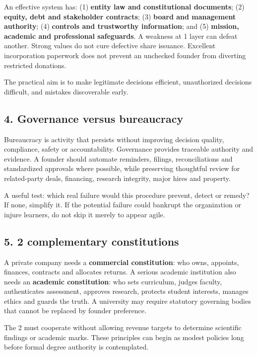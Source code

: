 An effective system has: (1) \textbf{entity law and constitutional documents}; (2) \textbf{equity, debt and stakeholder contracts}; (3) \textbf{board and management authority}; (4) \textbf{controls and trustworthy information}; and (5) \textbf{mission, academic and professional safeguards}. A weakness at 1 layer can defeat another. Strong values do not cure defective share issuance. Excellent incorporation paperwork does not prevent an unchecked founder from diverting restricted donations.

The practical aim is to make legitimate decisions efficient, unauthorized decisions difficult, and mistakes discoverable early.

\subsection{4. Governance versus bureaucracy}

Bureaucracy is activity that persists without improving decision quality, compliance, safety or accountability. Governance provides traceable authority and evidence. A founder should automate reminders, filings, reconciliations and standardized approvals where possible, while preserving thoughtful review for related-party deals, financing, research integrity, major hires and property.

A useful test: which real failure would this procedure prevent, detect or remedy? If none, simplify it. If the potential failure could bankrupt the organization or injure learners, do not skip it merely to appear agile.

\subsection{5. 2 complementary constitutions}

A private company needs a \textbf{commercial constitution}: who owns, appoints, finances, contracts and allocates returns. A serious academic institution also needs an \textbf{academic constitution}: who sets curriculum, judges faculty, authenticates assessment, approves research, protects student interests, manages ethics and guards the truth. A university may require statutory governing bodies that cannot be replaced by founder preference.

The 2 must cooperate without allowing revenue targets to determine scientific findings or academic marks. These principles can begin as modest policies long before formal degree authority is contemplated.

